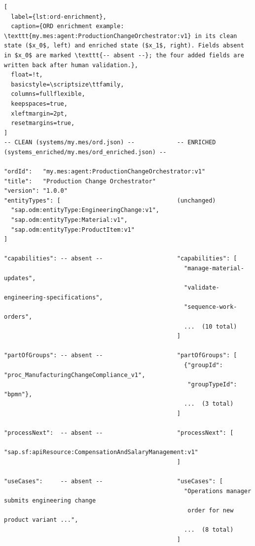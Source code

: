 \begin{lstlisting}[
  label={lst:ord-enrichment},
  caption={ORD enrichment example: \texttt{my.mes:agent:ProductionChangeOrchestrator:v1} in its clean state ($x_0$, left) and enriched state ($x_1$, right). Fields absent in $x_0$ are marked \texttt{-- absent --}; the four added fields are written back after human validation.},
  float=!t,
  basicstyle=\scriptsize\ttfamily,
  columns=fullflexible,
  keepspaces=true,
  xleftmargin=2pt,
  resetmargins=true,
]
-- CLEAN (systems/my.mes/ord.json) --            -- ENRICHED (systems_enriched/my.mes/ord_enriched.json) --

"ordId":   "my.mes:agent:ProductionChangeOrchestrator:v1"
"title":   "Production Change Orchestrator"
"version": "1.0.0"
"entityTypes": [                                 (unchanged)
  "sap.odm:entityType:EngineeringChange:v1",
  "sap.odm:entityType:Material:v1",
  "sap.odm:entityType:ProductItem:v1"
]

"capabilities": -- absent --                     "capabilities": [
                                                   "manage-material-updates",
                                                   "validate-engineering-specifications",
                                                   "sequence-work-orders",
                                                   ...  (10 total)
                                                 ]

"partOfGroups": -- absent --                     "partOfGroups": [
                                                   {"groupId": "proc_ManufacturingChangeCompliance_v1",
                                                    "groupTypeId": "bpmn"},
                                                   ...  (3 total)
                                                 ]

"processNext":  -- absent --                     "processNext": [
                                                   "sap.sf:apiResource:CompensationAndSalaryManagement:v1"
                                                 ]

"useCases":     -- absent --                     "useCases": [
                                                   "Operations manager submits engineering change
                                                    order for new product variant ...",
                                                   ...  (8 total)
                                                 ]
\end{lstlisting}


